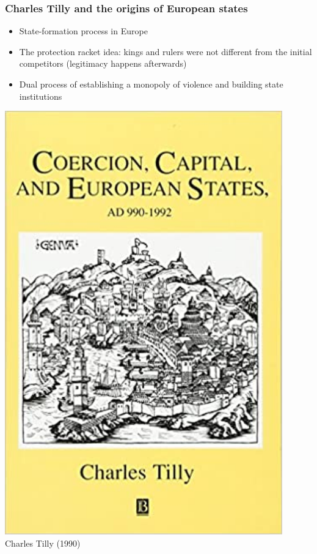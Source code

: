 \documentclass[aspectratio=43, handout]{beamer}
\begin{document}
\begin{frame}
\frametitle{Charles Tilly and the origins of European states}
\centering

\begin{minipage}{0.66\textwidth}\centering
\begin{itemize}
\item State-formation process in Europe
\item The protection racket idea: kings and rulers were not different from the initial competitors (legitimacy happens afterwards)
\item Dual process of establishing a monopoly of violence and building state institutions
\end{itemize}
\end{minipage}\hfill
\begin{minipage}{0.33\textwidth}\centering
\includegraphics[width = 0.9\textwidth]{img/tilly_book}\\\vspace{5pt}
{\small Charles Tilly (1990)}
\end{minipage}

\end{frame}
\end{document}
